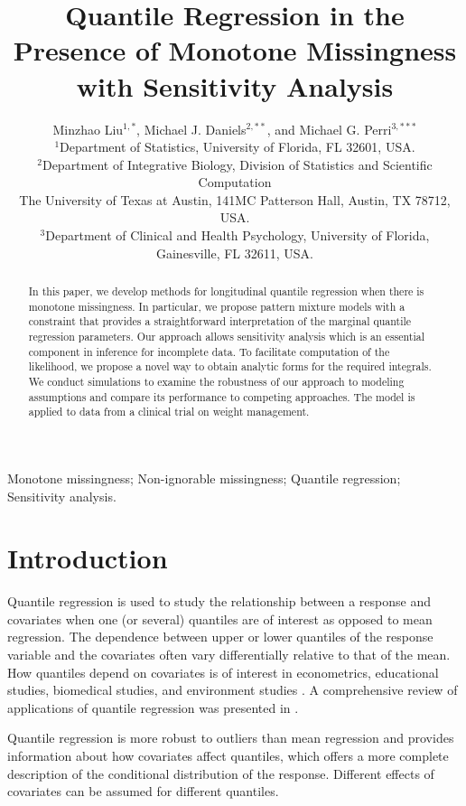 \documentclass[useAMS,usenatbib,referee]{biom}
\title[Quantile Regression with Missingness]{Quantile Regression in the Presence of Monotone Missingness with Sensitivity Analysis}
\author{Minzhao Liu$^{1,*}$\email{liuminzhao@ufl.edu},
  Michael J. Daniels$^{2,**}$\email{mjdaniels@austin.utexas.edu}, and
Michael G. Perri$^{3,***}$\email{mperri@phhp.ufl.edu} \\
  $^1$Department of Statistics, University of Florida, FL 32601, USA.\\
  $^2$Department of Integrative Biology, Division of Statistics and Scientific
  Computation\\
The University of Texas at Austin, 141MC Patterson Hall,
  Austin, TX 78712, USA.\\
$^3$Department of Clinical and Health Psychology,
 University of Florida, Gainesville, FL 32611, USA.
}
\begin{document}
\date{}

\pagerange{\pageref{firstpage}--\pageref{lastpage}}


\label{firstpage}

\begin{abstract}
  In this paper, we develop methods for longitudinal quantile regression when there is monotone missingness.
  In particular, we propose pattern mixture models with a constraint that provides a straightforward interpretation of the marginal quantile regression parameters.
  Our approach allows sensitivity analysis which is an essential component in inference for incomplete data.
  To facilitate computation of the likelihood, we propose a novel way to obtain analytic forms for the required integrals.  We conduct simulations to examine the robustness of our approach to modeling assumptions and compare its performance to competing approaches.
  The model is applied to data from a clinical trial on weight management.
\end{abstract}

\begin{keywords}
  Monotone missingness; Non-ignorable missingness; Quantile regression;
  Sensitivity analysis.
\end{keywords}

\maketitle

\section{Introduction}

Quantile regression is used to study the relationship between a
response and covariates when one (or several) quantiles are of
interest as opposed to mean regression.  The dependence between upper
or lower quantiles of the response variable and the covariates often
vary differentially relative to that of the mean. How quantiles depend
on covariates is of interest in econometrics, educational studies,
biomedical studies, and environment studies \citep{yu2001,
  buchinsky1994,buchinsky1998,he1998, koenker1999,wei2006,yu2003}. A
comprehensive review of applications of quantile regression was
presented in \citet{koenker2005}.

Quantile regression is more robust to outliers than mean regression
and provides information about how covariates affect quantiles, which
offers a more complete description of the conditional distribution of
the response. Different effects of covariates can be assumed for
different quantiles.
\end{document}

